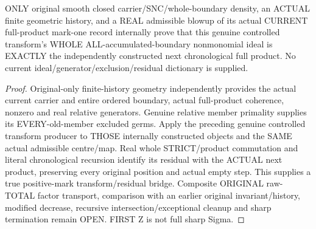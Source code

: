 \begin{theorem}
\label{hir:sharp-original-current-product-controlled-all-boundary-residual-dictionary}
\leanok
ONLY original smooth closed carrier/SNC/whole-boundary density, an ACTUAL
finite geometric history, and a REAL admissible blowup of its actual
CURRENT full-product mark-one record internally prove that this genuine
controlled transform's WHOLE ALL-accumulated-boundary nonmonomial ideal is
EXACTLY the independently constructed next chronological full product.
No current ideal/generator/exclusion/residual dictionary is supplied.
\end{theorem}
\begin{proof}
Original-only finite-history geometry independently provides the actual
current carrier and entire ordered boundary, actual full-product coherence,
nonzero and real relative generators. Genuine relative member primality
supplies its EVERY-old-member excluded germs. Apply the preceding genuine
controlled transform producer to THOSE internally constructed objects and
the SAME actual admissible centre/map. Real whole STRICT/product commutation
and literal chronological recursion identify its residual with the ACTUAL
next product, preserving every original position and actual empty step.
This supplies a true positive-mark transform/residual bridge. Composite
ORIGINAL raw-TOTAL factor transport, comparison with an earlier original
invariant/history, modified decrease, recursive intersection/exceptional
cleanup and sharp termination remain OPEN. FIRST Z is not full sharp Sigma.
\end{proof}
